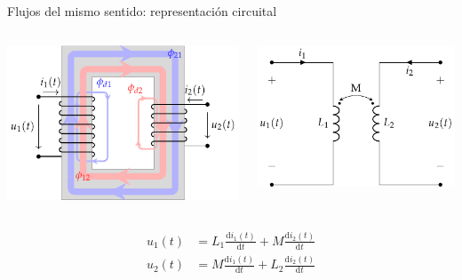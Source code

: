\documentclass[aspectratio=169, usenames,svgnames,dvipsnames]{beamer}
\begin{document}
\begin{frame}[label={sec:orga203dd4}]{Flujos del mismo sentido: representación circuital}
\begin{columns}
\begin{column}{0.5\columnwidth}
\begin{center}
\includegraphics[width=.9\linewidth]{../figs/acoplamientoTikz.pdf}
\end{center}
\end{column}

\begin{column}{0.5\columnwidth}
\begin{center}
\includegraphics[width=.9\linewidth]{../figs/acoplamiento_circuito.pdf}
\end{center}
\end{column}
\end{columns}

\begin{align*}
  u_1(t) &= L_1 \frac{\mathrm{d}i_1(t)}{\mathrm{d}t} + M \frac{\mathrm{d}i_2(t)}{\mathrm{d}t}\\
  u_2(t) &= M \frac{\mathrm{d}i_1(t)}{\mathrm{d}t} + L_2 \frac{\mathrm{d}i_2(t)}{\mathrm{d}t}
\end{align*}
\end{frame}
\end{document}
